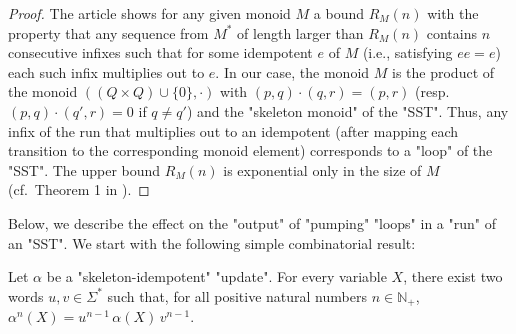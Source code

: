 \documentclass{theoretics}
\begin{document}
\begin{proof}
  The article \cite{JeckerSTACS21} shows for any given monoid $M$ a bound
  $R_M(n)$ with the property that any sequence from $M^*$ of length larger than
  $R_M(n)$ contains $n$ consecutive infixes such that for some idempotent
  $e$ of $M$ (i.e., satisfying $ee =e$) each such infix multiplies out
  to $e$.
  In our case, the monoid $M$ is the product of the 
  monoid $((Q \times Q) \cup \{0\},\cdot)$ with $(p,q)\cdot (q,r)=(p,r)$
  (resp.~$(p,q)\cdot (q',r)=0$ if $q \not= q'$) and the "skeleton monoid" of the "SST".
  Thus, any infix of the run that multiplies out to an idempotent
  (after mapping each transition to the corresponding monoid element)
  corresponds to  a "loop" of the "SST".
  The upper bound $R_M(n)$ is  exponential only in the size of $M$ (cf.~Theorem 1 in \cite{JeckerSTACS21}).
\end{proof}


Below, we describe the effect on the "output" of "pumping" 
"loops" in a "run" of an "SST".
We start with the following simple combinatorial result:


\begin{lemma}\label{lem:loop-pumping}
Let $\alpha$ be a "skeleton-idempotent" "update".
For every variable $X$, there exist two words $u,v \in \Sigma^*$ 
such that, for all positive natural numbers $n \in \mathbb{N}_+$, 
$\alpha^n(X)=u^{n-1} \, \alpha(X) \, v^{n-1}$.
\end{lemma}
\end{document}
